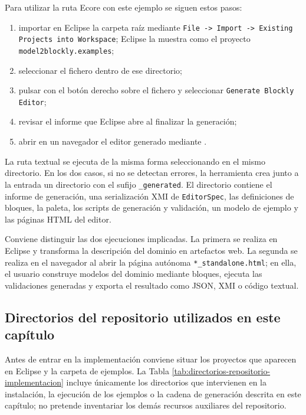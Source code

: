 Para utilizar la ruta Ecore con este ejemplo se siguen estos pasos:

\begin{enumerate}
  \item importar en Eclipse la carpeta raíz  mediante
  \texttt{File -> Import -> Existing Projects into Workspace}; Eclipse la
  muestra como el proyecto \texttt{model2blockly.examples};
  \item seleccionar el fichero  dentro de ese directorio;
  \item pulsar con el botón derecho sobre el fichero y seleccionar
  \texttt{Generate Blockly Editor};
  \item revisar el informe 
  que Eclipse abre al finalizar la generación;
  \item abrir en un navegador el editor generado mediante
  .
\end{enumerate}

La ruta textual se ejecuta de la misma forma seleccionando
 en
el mismo directorio. En los dos casos, si no se detectan errores, la
herramienta crea junto a la entrada un directorio con el sufijo
\texttt{\_generated}. El directorio contiene el informe de generación, una
serialización XMI de \texttt{EditorSpec}, las definiciones de bloques, la paleta,
los scripts de generación y validación, un modelo de ejemplo y las páginas HTML
del editor.

Conviene distinguir las dos ejecuciones implicadas. La primera se realiza en
Eclipse y transforma la descripción del dominio en artefactos web. La segunda se
realiza en el navegador al abrir la página autónoma
\texttt{*\_standalone.html}; en ella,
el usuario construye modelos del dominio mediante bloques, ejecuta las
validaciones generadas y exporta el resultado como JSON, XMI o código textual.

\subsection{Directorios del repositorio utilizados en este capítulo}
\label{subsec:directorios-repositorio-implementacion}

Antes de entrar en la implementación conviene situar los proyectos que aparecen
en Eclipse y la carpeta de ejemplos. La Tabla
\ref{tab:directorios-repositorio-implementacion} incluye únicamente los
directorios que intervienen en la instalación, la ejecución de los ejemplos o
la cadena de generación descrita en este capítulo; no pretende inventariar los
demás recursos auxiliares del repositorio.

